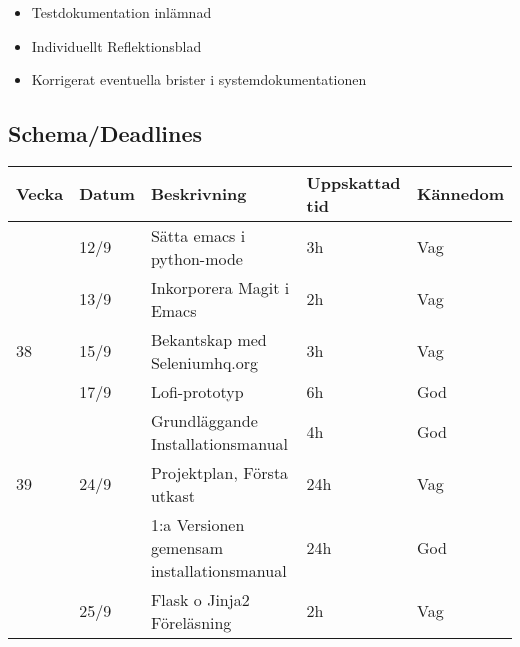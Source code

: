 \documentclass{TDP003mall}
\begin{document}
\begin{itemize}
	\item Testdokumentation inlämnad
	\item Individuellt Reflektionsblad
	\item Korrigerat eventuella brister i systemdokumentationen
\end{itemize}


\subsection{Schema/Deadlines}

\begin{tabularx}{\linewidth}{|l|l|X|l|l|}
	\hline
	Vecka & Datum & Beskrivning                                         & Uppskattad tid & Kännedom    \\ [0.5ex]
	\hline                                                              
          & 12/9  & Sätta emacs i python-mode                           & 3h             & Vag         \\
	\hline                                                              
          & 13/9  & Inkorporera Magit i Emacs                           & 2h             & Vag         \\
	\hline                                                              
	38    & 15/9  & Bekantskap med Seleniumhq.org                       & 3h             & Vag         \\
	\hline                                                              
          & 17/9  & Lofi-prototyp                                       & 6h             & God         \\
	\hline                                                              
          &       & Grundläggande Installationsmanual                   & 4h             & God         \\
	\hline                                                              
	39    & 24/9  & Projektplan, Första utkast                          & 24h            & Vag         \\
	\hline                                                              
          &       & 1:a Versionen gemensam installationsmanual          & 24h            & God         \\
	\hline                                                              
          & 25/9  & Flask o Jinja2 Föreläsning                          & 2h             & Vag         \\
	\hline                                                              

\end{tabularx}
\end{document}
